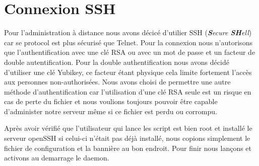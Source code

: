 \section{Connexion SSH}
Pour l'administration à distance nous avons décicé d'utilier SSH (\textit{\textbf{S}ecure \textbf{SH}ell}) car se protocol est plus sécurisé que Telnet. Pour la connexion nous n'autorisons que l'authentification avec une clé RSA ou avec un mot de passe et un facteur de double autentification. Pour la double authentification nous avons décidé d'utiliser une clé Yubikey, ce facteur étant physique cela limite fortement l'accès aux personnes non-authorisées. Nous avons choisi de permettre une autre méthode d'authentification car l'utilisation d'une clé RSA seule est un risque en cas de perte du fichier et nous voulions toujours pouvoir être capable d'administer notre serveur même si ce fichier est perdu ou corrompu.



Après avoir vérifié que l'utilisateur qui lance les script est bien root et installé le serveur openSSH si celui-ci n'était pas déjà installé, nous copions simplement le fichier de configuration et la bannière au bon endroit. Pour finir nous lançons et activons au demarrage le daemon.
